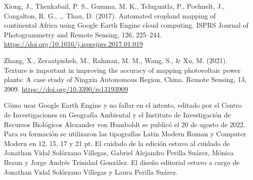 \documentclass[
  12pt,
  letterpaper,
  twoside]{book}
\renewcommand\headrulewidth{0pt}
\begin{document}
Xiong, J., Thenkabail, P. S., Gumma, M. K., Teluguntla, P., Poehnelt, J., Congalton, R. G., \ldots{} Thau, D. (2017). Automated cropland mapping of continental Africa using Google Earth Engine cloud computing. ISPRS Journal of Photogrammetry and Remote Sensing, 126, 225--244. \url{https://doi.org/10.1016/j.isprsjprs.2017.01.019}

Zhang, X., Zeraatpisheh, M., Rahman, M. M., Wang, S., \& Xu, M. (2021). Texture is important in improving the accuracy of mapping photovoltaic power plants: A case study of Ningxia Autonomous Region, China. Remote Sensing, 13, 3909. \url{https://doi.org/10.3390/rs13193909}

\backmatter
\renewcommand\headrulewidth{0pt}
\pagestyle{empty}
  \fancyhf{}
\printindex{}

\newpage
{}
\vspace*{\fill}
\begin{center}
Cómo usar Google Earth Engine y no fallar en el intento, editado por el Centro de Investigaciones en Geografía Ambiental y el Instituto de Investigación de Recursos Biológicos Alexander von Humboldt se publicó el 20 de agosto de 2022. Para su formación se utilizaron las tipografías Latin Modern Roman y Computer Modern en 12, 15, 17 y 21 pt. El cuidado de la edición estuvo al cuidado de Jonathan Vidal Solórzano Villegas, Gabriel Alejandro Perilla Suárez, Mónica Braun y Jorge Andrés Trinidad González. El diseño editorial estuvo a cargo de Jonathan Vidal Solórzano Villegas y Laura Perilla Suárez.
\end{center}
\vspace*{\fill}
\end{document}
